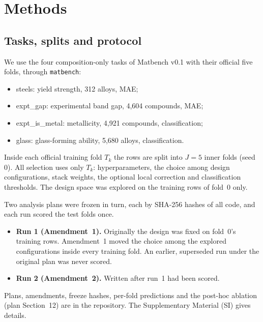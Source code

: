 \section{Methods}
\label{sec:methods}

\subsection{Tasks, splits and protocol}
We use the four composition-only tasks of Matbench v0.1 with their official five folds, through \texttt{matbench}:
\begin{itemize}
\item steels: yield strength, 312 alloys, MAE;
\item expt\_gap: experimental band gap, 4,604 compounds, MAE;
\item expt\_is\_metal: metallicity, 4,921 compounds, classification;
\item glass: glass-forming ability, 5,680 alloys, classification.
\end{itemize}
Inside each official training fold $T_k$ the rows are split into $J=5$ inner folds (seed 0).
All selection uses only $T_k$: hyperparameters, the choice among design configurations, stack weights, the optional local correction and classification thresholds.
The design space was explored on the training rows of fold~0 only.

Two analysis plans were frozen in turn, each by SHA-256 hashes of all code, and each run scored the test folds once.
\begin{itemize}
\item \textbf{Run 1 (Amendment~1).} Originally the design was fixed on fold~0's training rows. Amendment~1 moved the choice among the explored configurations inside every training fold. An earlier, superseded run under the original plan was never scored.
\item \textbf{Run 2 (Amendment~2).} Written after run~1 had been scored.
\end{itemize}
Plans, amendments, freeze hashes, per-fold predictions and the post-hoc ablation (plan Section~12) are in the repository. The Supplementary Material (SI) gives details.

